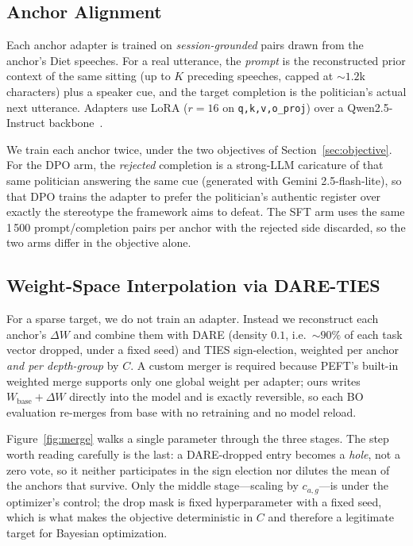 \documentclass[11pt,letterpaper]{article}
\begin{document}
\subsection{Anchor Alignment}
Each anchor adapter is trained on \emph{session-grounded} pairs drawn from the anchor's Diet speeches. For a real utterance, the \emph{prompt} is the reconstructed prior context of the same sitting (up to $K$ preceding speeches, capped at ${\sim}1.2$k characters) plus a speaker cue, and the target completion is the politician's actual next utterance. Adapters use LoRA ($r{=}16$ on \texttt{q,k,v,o\_proj}) over a Qwen2.5-Instruct backbone~\cite{qwen2025qwen25}.

We train each anchor twice, under the two objectives of Section~\ref{sec:objective}. For the DPO arm, the \emph{rejected} completion is a strong-LLM caricature of that same politician answering the same cue (generated with Gemini 2.5-flash-lite), so that DPO trains the adapter to prefer the politician's authentic register over exactly the stereotype the framework aims to defeat. The SFT arm uses the same 1\,500 prompt/completion pairs per anchor with the rejected side discarded, so the two arms differ in the objective alone.

\subsection{Weight-Space Interpolation via DARE-TIES}
For a sparse target, we do not train an adapter. Instead we reconstruct each anchor's $\Delta W$ and combine them with DARE (density $0.1$, i.e.\ ${\sim}90\%$ of each task vector dropped, under a fixed seed) and TIES sign-election, weighted per anchor \emph{and per depth-group} by $C$. A custom merger is required because PEFT's built-in weighted merge supports only one global weight per adapter; ours writes $W_{\text{base}}+\Delta W$ directly into the model and is exactly reversible, so each BO evaluation re-merges from base with no retraining and no model reload.

Figure~\ref{fig:merge} walks a single parameter through the three stages. The step worth reading carefully is the last: a DARE-dropped entry becomes a \emph{hole}, not a zero vote, so it neither participates in the sign election nor dilutes the mean of the anchors that survive. Only the middle stage---scaling by $c_{a,g}$---is under the optimizer's control; the drop mask is fixed hyperparameter with a fixed seed, which is what makes the objective deterministic in $C$ and therefore a legitimate target for Bayesian optimization.
\end{document}
